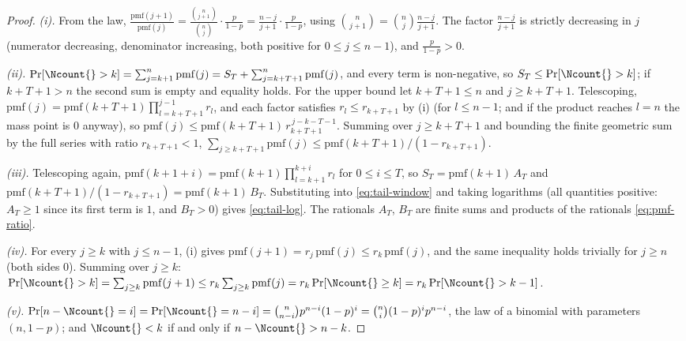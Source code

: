 \begin{proof}
\emph{(i).} From the law,
$\frac{\mathrm{pmf}(j+1)}{\mathrm{pmf}(j)}
=\frac{\binom{n}{j+1}}{\binom{n}{j}}\cdot\frac{p}{1-p}
=\frac{n-j}{j+1}\cdot\frac{p}{1-p}$, using
$\binom{n}{j+1}=\binom{n}{j}\frac{n-j}{j+1}$. The factor $\frac{n-j}{j+1}$
is strictly decreasing in $j$ (numerator decreasing, denominator
increasing, both positive for $0\le j\le n-1$), and $\frac{p}{1-p}>0$.

\emph{(ii).} $\Pr[\Ncount{}>k]=\sum_{j=k+1}^{n}\mathrm{pmf}(j)
=S_T+\sum_{j=k+T+1}^{n}\mathrm{pmf}(j)$, and every term is non-negative, so
$S_T\le\Pr[\Ncount{}>k]$; if $k+T+1>n$ the second sum is empty and equality
holds. For the upper bound let $k+T+1\le n$ and $j\ge k+T+1$. Telescoping,
$\mathrm{pmf}(j)=\mathrm{pmf}(k+T+1)\prod_{l=k+T+1}^{j-1}r_l$, and each
factor satisfies $r_l\le r_{k+T+1}$ by (i) (for $l\le n-1$; and if the
product reaches $l=n$ the mass point is $0$ anyway), so
$\mathrm{pmf}(j)\le\mathrm{pmf}(k+T+1)\,r_{k+T+1}^{\,j-k-T-1}$. Summing over
$j\ge k+T+1$ and bounding the finite geometric sum by the full series with
ratio $r_{k+T+1}<1$,
$\sum_{j\ge k+T+1}\mathrm{pmf}(j)\le\mathrm{pmf}(k+T+1)/(1-r_{k+T+1})$.

\emph{(iii).} Telescoping again,
$\mathrm{pmf}(k+1+i)=\mathrm{pmf}(k+1)\prod_{l=k+1}^{k+i}r_l$ for
$0\le i\le T$, so $S_T=\mathrm{pmf}(k+1)\,A_T$ and
$\mathrm{pmf}(k+T+1)/(1-r_{k+T+1})=\mathrm{pmf}(k+1)\,B_T$. Substituting
into \eqref{eq:tail-window} and taking logarithms (all quantities positive:
$A_T\ge1$ since its first term is $1$, and $B_T>0$) gives
\eqref{eq:tail-log}. The rationals $A_T$, $B_T$ are finite sums and
products of the rationals \eqref{eq:pmf-ratio}.

\emph{(iv).} For every $j\ge k$ with $j\le n-1$, (i) gives
$\mathrm{pmf}(j+1)=r_j\,\mathrm{pmf}(j)\le r_k\,\mathrm{pmf}(j)$, and the
same inequality holds trivially for $j\ge n$ (both sides $0$). Summing over
$j\ge k$: $\Pr[\Ncount{}>k]=\sum_{j\ge k}\mathrm{pmf}(j+1)\le
r_k\sum_{j\ge k}\mathrm{pmf}(j)=r_k\Pr[\Ncount{}\ge k]
=r_k\Pr[\Ncount{}>k-1]$.

\emph{(v).} $\Pr[n-\Ncount{}=i]=\Pr[\Ncount{}=n-i]
=\binom{n}{n-i}p^{n-i}(1-p)^{i}=\binom{n}{i}(1-p)^{i}p^{n-i}$, the law of a
binomial with parameters $(n,1-p)$; and $\Ncount{}<k$ if and only if
$n-\Ncount{}>n-k$.
\end{proof}
